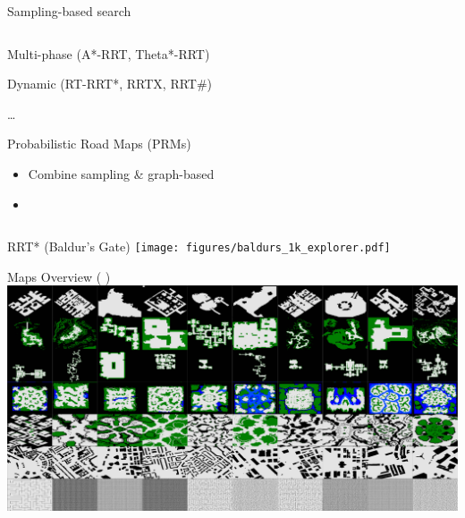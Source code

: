 \documentclass[aspectratio=169]{beamer}
\makeatletter
\newcommand{\white}[1]{{\color{pureminimalistic@text@white} #1}}
\newcommand{\red}[1]{{\color{pureminimalistic@text@red} #1}}
\makeatother
\begin{document}
\begin{frame}[plain]{Sampling-based search}
\begin{columns}[T]
\begin{column}{.65\linewidth}
\begin{vfilleditems}
\begin{itemize}
{                  \item Multi-phase (A*-RRT, Theta*-RRT)
                  \item Dynamic (RT-RRT*, RRTX, RRT#)}
                  \item \red{\cite{lavalle2001randomized}\ldots}
              \end{itemize}
              \vspace{1em}
              \item {\Large Probabilistic Road Maps \red{(PRMs)}}
              \begin{itemize}
                  \item Combine sampling \& graph-based
                  \item \red{\cite{kavraki1996probabilistic}}
              \end{itemize}
          \end{vfilleditems}
      \end{column}
  \end{columns}
\end{frame}

\begin{frame}[plain]{RRT* \white{(Baldur's Gate)}}
    \texttt{[image: figures/baldurs\_1k\_explorer.pdf]}
\end{frame}

\begin{frame}{Maps Overview {\Medium \color{white}( \cite{sturtevant2012benchmarks})}}
    \includegraphics[width=0.95\linewidth, keepaspectratio]{figures/show_maps_overview.pdf}
\end{frame}
\end{document}
